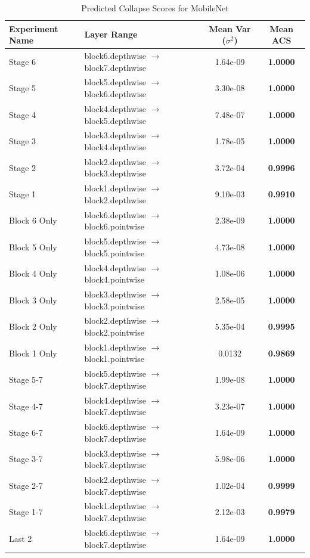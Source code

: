 \begin{table}[h]
\caption{Predicted Collapse Scores for MobileNet}
\label{tab:acs_mobilenet}
\begin{tabular}{llcc}
\toprule
Experiment Name & Layer Range & Mean Var ($\sigma^2$) & Mean ACS \\
\midrule
Stage 6 & block6.depthwise $\to$ block7.depthwise & 1.64e-09 & \textbf{1.0000} \\
Stage 5 & block5.depthwise $\to$ block6.depthwise & 3.30e-08 & \textbf{1.0000} \\
Stage 4 & block4.depthwise $\to$ block5.depthwise & 7.48e-07 & \textbf{1.0000} \\
Stage 3 & block3.depthwise $\to$ block4.depthwise & 1.78e-05 & \textbf{1.0000} \\
Stage 2 & block2.depthwise $\to$ block3.depthwise & 3.72e-04 & \textbf{0.9996} \\
Stage 1 & block1.depthwise $\to$ block2.depthwise & 9.10e-03 & \textbf{0.9910} \\
Block 6 Only & block6.depthwise $\to$ block6.pointwise & 2.38e-09 & \textbf{1.0000} \\
Block 5 Only & block5.depthwise $\to$ block5.pointwise & 4.73e-08 & \textbf{1.0000} \\
Block 4 Only & block4.depthwise $\to$ block4.pointwise & 1.08e-06 & \textbf{1.0000} \\
Block 3 Only & block3.depthwise $\to$ block3.pointwise & 2.58e-05 & \textbf{1.0000} \\
Block 2 Only & block2.depthwise $\to$ block2.pointwise & 5.35e-04 & \textbf{0.9995} \\
Block 1 Only & block1.depthwise $\to$ block1.pointwise & 0.0132 & \textbf{0.9869} \\
Stage 5-7 & block5.depthwise $\to$ block7.depthwise & 1.99e-08 & \textbf{1.0000} \\
Stage 4-7 & block4.depthwise $\to$ block7.depthwise & 3.23e-07 & \textbf{1.0000} \\
Stage 6-7 & block6.depthwise $\to$ block7.depthwise & 1.64e-09 & \textbf{1.0000} \\
Stage 3-7 & block3.depthwise $\to$ block7.depthwise & 5.98e-06 & \textbf{1.0000} \\
Stage 2-7 & block2.depthwise $\to$ block7.depthwise & 1.02e-04 & \textbf{0.9999} \\
Stage 1-7 & block1.depthwise $\to$ block7.depthwise & 2.12e-03 & \textbf{0.9979} \\
Last 2 & block6.depthwise $\to$ block7.depthwise & 1.64e-09 & \textbf{1.0000} \\
\bottomrule
\end{tabular}
\end{table}
